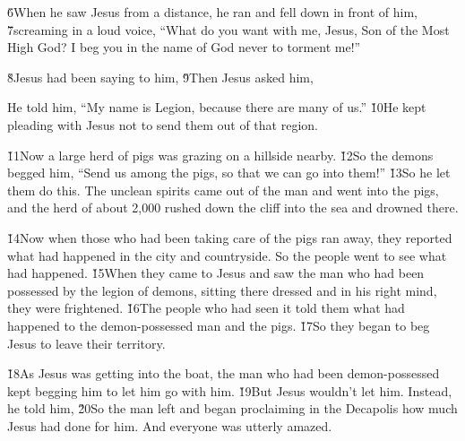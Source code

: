 \v{6}When he saw Jesus from a distance, he ran and fell down in front of him, \v{7}screaming in a loud voice, ``What do you want with me, Jesus, Son of the Most High God? I beg you in the name of God never to torment me!''

\v{8}Jesus had been saying to him,  \v{9}Then Jesus asked him, 

He told him, ``My name is Legion, because there are many of us.'' \v{10}He kept pleading with Jesus not to send them out of that region.

\v{11}Now a large herd of pigs was grazing on a hillside nearby. \v{12}So the demons begged him, ``Send us among the pigs, so that we can go into them!'' \v{13}So he let them do this. The unclean spirits came out of the man and went into the pigs, and the herd of about 2,000 rushed down the cliff into the sea and drowned there.

\v{14}Now when those who had been taking care of the pigs ran away, they reported what had happened in the city and countryside. So the people went to see what had happened. \v{15}When they came to Jesus and saw the man who had been possessed by the legion of demons, sitting there dressed and in his right mind, they were frightened. \v{16}The people who had seen it told them what had happened to the demon-possessed man and the pigs. \v{17}So they began to beg Jesus to leave their territory.

\v{18}As Jesus was getting into the boat, the man who had been demon-possessed kept begging him to let him go with him. \v{19}But Jesus wouldn't let him. Instead, he told him,  \v{20}So the man left and began proclaiming in the Decapolis how much Jesus had done for him. And everyone was utterly amazed.

